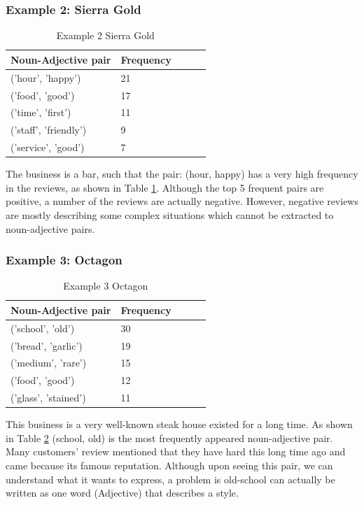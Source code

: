 \documentclass[sigconf]{acmart}
\begin{document}
\subsubsection{Example 2: Sierra Gold}
\begin{table}
  \caption{Example 2 Sierra Gold}
  \label{tab:n_adj_2}
  \begin{tabular}{lllll}
    \toprule
    Noun-Adjective pair & Frequency \\
    \midrule
    ('hour', 'happy') & 21\\
    ('food', 'good') & 17\\
    ('time', 'first') & 11\\
    ('staff', 'friendly') & 9\\
    ('service', 'good') & 7\\
\end{tabular}
\end{table}

The business is a bar, such that the pair: (hour, happy) has a very high frequency in the reviews, as shown in Table \ref{tab:n_adj_2}. Although the top 5 frequent pairs are positive, a number of the reviews are actually negative. However, negative reviews are mostly describing some complex situations which cannot be extracted to noun-adjective pairs.

\subsubsection{Example 3: Octagon}
\begin{table}
  \caption{Example 3 Octagon}
  \label{tab:n_adj_3}
  \begin{tabular}{lllll}
    \toprule
    Noun-Adjective pair & Frequency \\
    \midrule
    ('school', 'old') & 30\\
    ('bread', 'garlic') & 19\\
    ('medium', 'rare') & 15\\
    ('food', 'good') & 12\\
    ('glass', 'stained') & 11\\
\end{tabular}
\end{table}

This business is a very well-known steak house existed for a long time. As shown in Table \ref{tab:n_adj_3} (school, old) is the most frequently appeared noun-adjective pair. Many customers’ review mentioned that they have hard this long time ago and came because its famous reputation. Although upon seeing this pair, we can understand what it wants to express, a problem is old-school can actually be written as one word (Adjective) that describes a style. 
\end{document}
